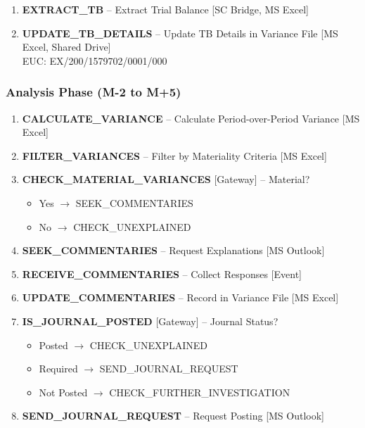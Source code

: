 \documentclass[11pt,a4paper]{article}
\begin{document}
\begin{enumerate}[nosep,start=6]
    \item \textbf{EXTRACT\_TB} -- Extract Trial Balance {\small [SC Bridge, MS Excel]}
    \item \textbf{UPDATE\_TB\_DETAILS} -- Update TB Details in Variance File {\small [MS Excel, Shared Drive]} \\
          {\footnotesize EUC: EX/200/1579702/0001/000}
\end{enumerate}

\subsubsection{Analysis Phase (M-2 to M+5)}

\begin{enumerate}[nosep,start=8]
    \item \textbf{CALCULATE\_VARIANCE} -- Calculate Period-over-Period Variance {\small [MS Excel]}
    \item \textbf{FILTER\_VARIANCES} -- Filter by Materiality Criteria {\small [MS Excel]}
    \item \textbf{CHECK\_MATERIAL\_VARIANCES} {\small [Gateway]} -- Material?
        \begin{itemize}[nosep]
            \item Yes $\rightarrow$ SEEK\_COMMENTARIES
            \item No $\rightarrow$ CHECK\_UNEXPLAINED
        \end{itemize}
    \item \textbf{SEEK\_COMMENTARIES} -- Request Explanations {\small [MS Outlook]}
    \item \textbf{RECEIVE\_COMMENTARIES} -- Collect Responses {\small [Event]}
    \item \textbf{UPDATE\_COMMENTARIES} -- Record in Variance File {\small [MS Excel]}
    \item \textbf{IS\_JOURNAL\_POSTED} {\small [Gateway]} -- Journal Status?
        \begin{itemize}[nosep]
            \item Posted $\rightarrow$ CHECK\_UNEXPLAINED
            \item Required $\rightarrow$ SEND\_JOURNAL\_REQUEST
            \item Not Posted $\rightarrow$ CHECK\_FURTHER\_INVESTIGATION
        \end{itemize}
    \item \textbf{SEND\_JOURNAL\_REQUEST} -- Request Posting {\small [MS Outlook]}

\end{enumerate}
\end{document}
